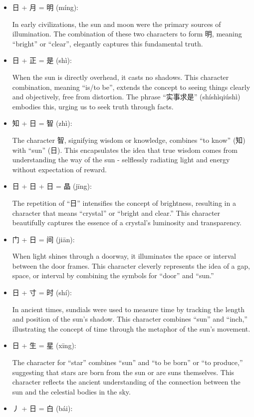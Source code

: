 \documentclass[
  11pt,
  letterpaper,
]{article}
\begin{document}
\begin{itemize}
\item
  日 + 月 = 明 (míng):

  In early civilizations, the sun and moon were the primary sources of
  illumination. The combination of these two characters to form 明,
  meaning ``bright'' or ``clear'', elegantly captures this fundamental
  truth.
\item
  日 + 正 = 是 (shì):

  When the sun is directly overhead, it casts no shadows. This character
  combination, meaning ``is/to be'', extends the concept to seeing
  things clearly and objectively, free from distortion. The phrase
  ``实事求是'' (shíshìqiúshì) embodies this, urging us to seek truth
  through facts.
\item
  知 + 日 = 智 (zhì):

  The character 智, signifying wisdom or knowledge, combines ``to know''
  (知) with ``sun'' (日). This encapsulates the idea that true wisdom
  comes from understanding the way of the sun - selflessly radiating
  light and energy without expectation of reward.
\item
  日 + 日 + 日 = 晶 (jīng):

  The repetition of ``日'' intensifies the concept of brightness,
  resulting in a character that means ``crystal'' or ``bright and
  clear.'' This character beautifully captures the essence of a
  crystal's luminosity and transparency.
\item
  门 + 日 = 间 (jiān):

  When light shines through a doorway, it illuminates the space or
  interval between the door frames. This character cleverly represents
  the idea of a gap, space, or interval by combining the symbols for
  ``door'' and ``sun.''
\item
  日 + 寸 = 时 (shí):

  In ancient times, sundials were used to measure time by tracking the
  length and position of the sun's shadow. This character combines
  ``sun'' and ``inch,'' illustrating the concept of time through the
  metaphor of the sun's movement.
\item
  日 + 生 = 星 (xīng):

  The character for ``star'' combines ``sun'' and ``to be born'' or ``to
  produce,'' suggesting that stars are born from the sun or are suns
  themselves. This character reflects the ancient understanding of the
  connection between the sun and the celestial bodies in the sky.
\item
  丿 + 日 = 白 (bái):


\end{itemize}
\end{document}

